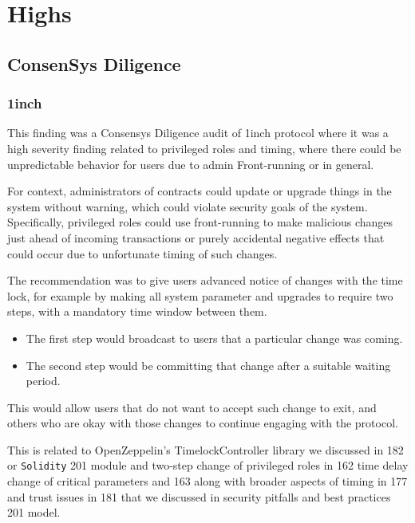 \section{Highs}\label{highs}

\subsection{ConsenSys Diligence}\label{consensys-diligence}

\subsubsection{\texorpdfstring{\textbf{1inch}}{1inch}}\label{inch}

This finding was a Consensys Diligence audit of 1inch protocol where it
was a high severity finding related to privileged roles and timing,
where there could be unpredictable behavior for users due to admin
Front-running or in general.

For context, administrators of contracts could update or upgrade things
in the system without warning, which could violate security goals of the
system. Specifically, privileged roles could use front-running to make
malicious changes just ahead of incoming transactions or purely
accidental negative effects that could occur due to unfortunate timing
of such changes.

The recommendation was to give users advanced notice of changes with the
time lock, for example by making all system parameter and upgrades to
require two steps, with a mandatory time window between them.

\begin{itemize}
\tightlist
\item
  The first step would broadcast to users that a particular change was
  coming.
\item
  The second step would be committing that change after a suitable
  waiting period.
\end{itemize}

This would allow users that do not want to accept such change to exit,
and others who are okay with those changes to continue engaging with the
protocol.

This is related to OpenZeppelin's TimelockController library we
discussed in 182 or \texttt{Solidity} 201 module and two-step change of
privileged roles in 162 time delay change of critical parameters and 163
along with broader aspects of timing in 177 and trust issues in 181 that
we discussed in security pitfalls and best practices 201 model.

